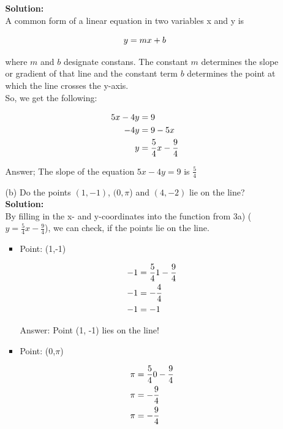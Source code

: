 \documentclass[a4paper]{article}
\begin{document}
\begin{enumerate}
\begin{itemize}
	\textbf{Solution:}\\
	
A common form of a linear equation in two variables x and y is 

\begin{equation}
	y = mx + b \notag
\end{equation}

where $m$ and $b$ designate constans. The constant $m$ determines the slope or gradient of that line and the constant term $b$ determines the point at which the line crosses the y-axis.\\		
	
So, we get the following:	
	
\begin{align}
5x - 4y  &= 9  \notag \\
-4y &= 9 - 5x \notag \\
y &= \frac{5}{4}x - \frac{9}{4} \notag
\end{align}
	
Answer; The slope of the equation $5x - 4y = 9$ is  $\frac{5}{4}$\\

	
	\item[(b)] Do the points $(1,-1)$, $(0, \pi$) and $(4,-2)$ lie on the line?\\
	
	\textbf{Solution:}\\
	
By filling in the x- and y-coordinates into the function from 3a) ($y = \frac{5}{4}x - \frac{9}{4}$), we can check, if the points lie on the line.\\

\begin{itemize}
	\item Point: (1,-1)
	
	\begin{align*}
		-1 &= \frac{5}{4}1 - \frac{9}{4} \notag \\
		-1 &= -\frac{4}{4} \notag \\
		-1 &= -1
	\end{align*}
	
Answer: Point (1, -1) lies on the line!\\

	\item Point: (0,$\pi$)
	
		\begin{align*}
		\pi &= \frac{5}{4}0 - \frac{9}{4} \notag \\
		\pi &= -\frac{9}{4} \notag \\
		\pi &= -\frac{9}{4}
	\end{align*}	
	

\end{itemize}
\end{itemize}
\end{enumerate}
\end{document}
